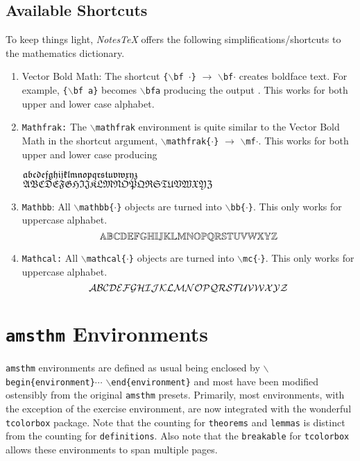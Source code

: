 \subsection{Available Shortcuts}
To keep things light, \textit{NotesTeX} offers the following simplifications/shortcuts to the mathematics dictionary.
\begin{enumerate}
  \item Vector Bold Math: The shortcut \texttt{\{$\backslash$bf $\cdot$\}} $\longrightarrow$ \texttt{$\backslash$bf$\cdot$} creates boldface text. For example, \texttt{\{$\backslash$bf a\}} becomes \texttt{$\backslash$bfa} producing the output \bfa. This works for both upper and lower case alphabet.
  \item \texttt{Mathfrak:} The \texttt{$\backslash$mathfrak} environment is quite similar to the Vector Bold Math in the shortcut argument, \texttt{$\backslash$mathfrak\{$\cdot$\}} $\longrightarrow$ \texttt{$\backslash$mf$\cdot$}. This works for both upper and lower case producing
  \begin{center}
    ${\mathfrak{a}}{\mathfrak{b}}{\mathfrak{c}}{\mathfrak{d}}{\mathfrak{e}}{\mathfrak{f}}{\mathfrak{g}}{\mathfrak{h}}{\mathfrak{i}}{\mathfrak{j}}{\mathfrak{k}}{\mathfrak{l}}{\mathfrak{m}}{\mathfrak{n}}{\mathfrak{o}}{\mathfrak{p}}{\mathfrak{q}}{\mathfrak{r}}{\mathfrak{s}}{\mathfrak{t}}{\mathfrak{u}}{\mathfrak{v}}{\mathfrak{w}}{\mathfrak{x}}{\mathfrak{y}}{\mathfrak{z}}$\\
    ${\mathfrak{A}}{\mathfrak{B}}{\mathfrak{C}}{\mathfrak{D}}{\mathfrak{E}}{\mathfrak{F}}{\mathfrak{G}}{\mathfrak{H}}{\mathfrak{I}}{\mathfrak{J}}{\mathfrak{K}}{\mathfrak{L}}{\mathfrak{M}}{\mathfrak{N}}{\mathfrak{O}}{\mathfrak{P}}{\mathfrak{Q}}{\mathfrak{R}}{\mathfrak{S}}{\mathfrak{T}}{\mathfrak{U}}{\mathfrak{V}}{\mathfrak{W}}{\mathfrak{X}}{\mathfrak{Y}}{\mathfrak{Z}}$
  \end{center}
  \item \texttt{Mathbb}: All \texttt{$\backslash$mathbb\{$\cdot$\}} objects are turned into \texttt{$\backslash$bb\{$\cdot$\}}. This only works for uppercase alphabet.
  \begin{equation*}
    {\mathbb{A}}{\mathbb{B}}{\mathbb{C}}{\mathbb{D}}{\mathbb{E}}{\mathbb{F}}{\mathbb{G}}{\mathbb{H}}{\mathbb{I}}{\mathbb{J}}{\mathbb{K}}{\mathbb{L}}{\mathbb{M}}{\mathbb{N}}{\mathbb{O}}{\mathbb{P}}{\mathbb{Q}}{\mathbb{R}}{\mathbb{S}}{\mathbb{T}}{\mathbb{U}}{\mathbb{V}}{\mathbb{W}}{\mathbb{X}}{\mathbb{Y}}{\mathbb{Z}}
  \end{equation*}
  \item \texttt{Mathcal:} All \texttt{$\backslash$mathcal\{$\cdot$\}} objects are turned into \texttt{$\backslash$mc\{$\cdot$\}}. This only works for uppercase alphabet.
  \begin{equation*}
    {\mathcal{A}}{\mathcal{B}}{\mathcal{C}}{\mathcal{D}}{\mathcal{E}}{\mathcal{F}}{\mathcal{G}}{\mathcal{H}}{\mathcal{I}}{\mathcal{J}}{\mathcal{K}}{\mathcal{L}}{\mathcal{M}}{\mathcal{N}}{\mathcal{O}}{\mathcal{P}}{\mathcal{Q}}{\mathcal{R}}{\mathcal{S}}{\mathcal{T}}{\mathcal{U}}{\mathcal{V}}{\mathcal{W}}{\mathcal{X}}{\mathcal{Y}}{\mathcal{Z}}
  \end{equation*}
\end{enumerate}


\newpage
\section{\texttt{amsthm} Environments}\label{Sub:Special}
\texttt{amsthm} environments are defined as usual being enclosed by \texttt{$\backslash$begin\{environment\}}$\cdots$ \texttt{$\backslash$end\{environment\}} and most have been modified ostensibly from the original \texttt{amsthm} presets. Primarily, most environments, with the exception of the exercise environment, are now integrated with the wonderful \texttt{tcolorbox} package. Note that the counting for \texttt{theorems} and \texttt{lemmas} is distinct from the counting for \texttt{definitions}. Also note that the \texttt{breakable} for \texttt{tcolorbox} allows these environments to span multiple pages.

